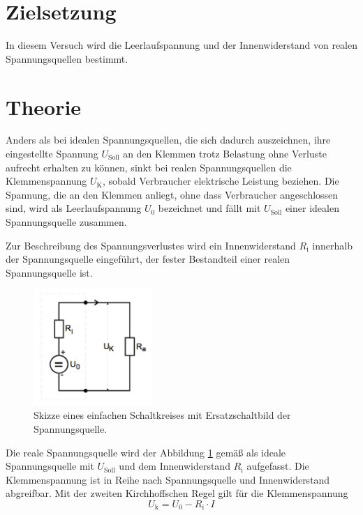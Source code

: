 \section{Zielsetzung}
In diesem Versuch wird die Leerlaufspannung und der Innenwiderstand von realen Spannungsquellen bestimmt.

\section{Theorie}
\label{sec:Theorie}
Anders als bei idealen Spannungsquellen, die sich dadurch auszeichnen, ihre eingestellte Spannung $U_\text{Soll}$ an den Klemmen trotz Belastung ohne Verluste aufrecht erhalten zu können, 
sinkt bei realen Spannungsquellen die Klemmenspannung $U_\text{K}$, sobald Verbraucher elektrische Leistung beziehen.
Die Spannung, die an den Klemmen anliegt, ohne dass Verbraucher angeschlossen sind, 
wird als Leerlaufspannung $U_0$ bezeichnet und fällt mit $U_\text{Soll}$ einer idealen Spannungsquelle zusammen.

Zur Beschreibung des Spannungsverlustes wird ein Innenwiderstand $R_\text{i}$ innerhalb der Spannungsquelle eingeführt, der fester Bestandteil einer realen Spannungsquelle ist.
\begin{figure}[ht]
	\centering
  	\includegraphics[width=0.4\textwidth]{Bilder/Innenwiderstand}
	\caption{Skizze eines einfachen Schaltkreises mit Ersatzschaltbild der Spannungsquelle. \cite{V301}}
	\label{fig:Innenleben}
\end{figure}
Die reale Spannungsquelle wird der Abbildung \ref{fig:Innenleben} gemäß als ideale Spannungsquelle mit $U_\text{Soll}$ und dem Innenwiderstand $R_\text{i}$ aufgefasst. 
Die Klemmenspannung ist in Reihe nach Spannungsquelle und Innenwiderstand abgreifbar.
Mit der zweiten Kirchhoffschen Regel gilt für die Klemmenspannung
\begin{equation}
	U_\text{k} = U_\text{0} - R_\text{i}\cdot I
	\label{eq:Klemmspannung}
\end{equation}

